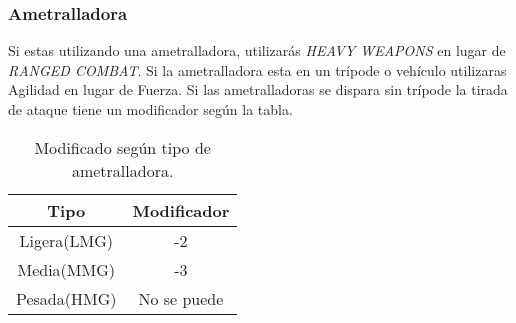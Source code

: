 \subsubsection{Ametralladora}
Si estas utilizando una ametralladora, utilizarás \emph{HEAVY WEAPONS} en lugar de \emph{RANGED COMBAT}. Si la ametralladora esta en un trípode o vehículo utilizaras Agilidad en lugar de Fuerza. Si las ametralladoras se dispara sin trípode la tirada de ataque tiene un modificador según la tabla.

    \begin{table}
        \centering
        \begin{tabular}{ c c }
            \hline
            Tipo & Modificador \\
            \hline
            Ligera(LMG) & -2 \\
            Media(MMG) & -3 \\
            Pesada(HMG) & No se puede \\
            \hline
        \end{tabular}
        \caption{Modificado según tipo de ametralladora.}
        \label{table:3}
    \end{table}